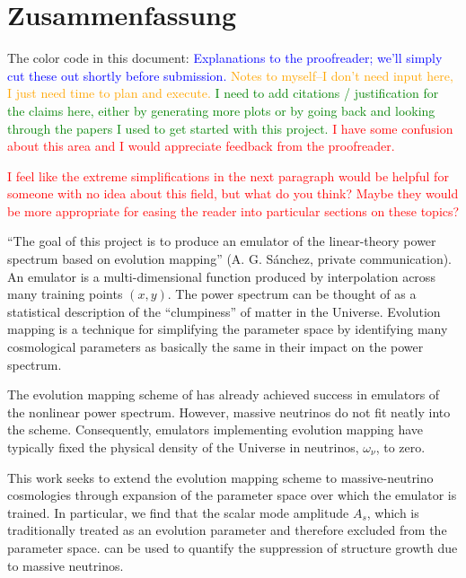 

\chapter*{Zusammenfassung}

The color code in this document: \textcolor{blue}{Explanations to the
proofreader; we'll simply cut these out shortly before submission.}
\textcolor{orange}{Notes to myself--I don't need input here, I just need time
to plan and execute.} \textcolor{green}{I need to add citations / 
justification for the claims here, either by generating more plots or by going
back and looking through the papers I used to get started with this project.}
\textcolor{red}{I have some confusion about this area and I would appreciate
feedback from the proofreader.}

\textcolor{red}{I feel like the extreme simplifications in the next paragraph
would be helpful for someone with no idea about this field, but what do you
think? Maybe they would be more appropriate for easing the reader into
particular sections on these topics?}

``The goal of this project is to produce an emulator of the linear-theory
power spectrum based on evolution mapping'' (A. G. S\'{a}nchez, private
communication). An emulator is a multi-dimensional function
produced by interpolation across many training points $(x, y)$. The power
spectrum can be thought of as a statistical description of the ``clumpiness''
of matter in the Universe. Evolution mapping is a technique for simplifying
the parameter space by identifying many cosmological parameters as basically
the same in their impact on the power spectrum.

The evolution mapping scheme of  has already achieved success in
emulators of the nonlinear power spectrum. However, massive neutrinos do not
fit neatly into the scheme. Consequently, emulators implementing evolution
mapping have typically fixed the physical density of the Universe in 
neutrinos, $\omega_\nu$, to zero.

This work seeks to extend the evolution mapping scheme to massive-neutrino 
cosmologies through expansion of the parameter space over which the emulator
is trained. In particular, we find that the scalar mode amplitude $A_s$, which
is traditionally treated as an evolution parameter and therefore excluded from 
the parameter space. can be used to quantify the suppression of structure 
growth due to massive neutrinos.

